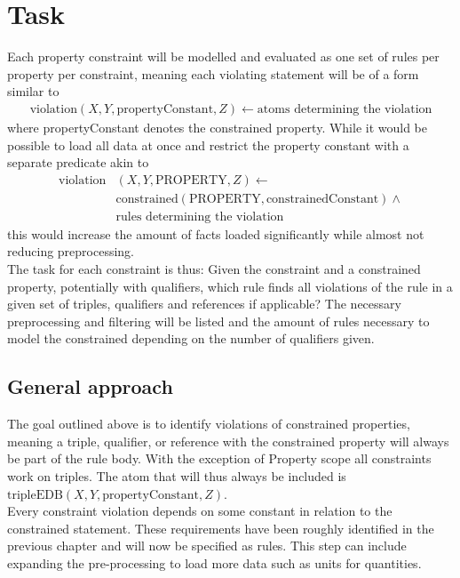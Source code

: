 \documentclass[hyperref,bachelorofscience,fleqn]{cgvpub}
\begin{document}
\section{Task}
Each property constraint will be modelled and evaluated as one set of rules per property per constraint, meaning each violating statement will be of a form similar to
\begin{equation}
\begin{split}
\text{violation}(X, Y, \text{propertyConstant}, Z) \leftarrow \text{atoms determining the violation}
\end{split}
\end{equation}
where propertyConstant denotes the constrained property. While it would be possible to load all data at once and restrict the property constant with a separate predicate akin to
\begin{equation}
\begin{split}
\text{violation}&(X, Y, \text{PROPERTY}, Z) \leftarrow \\
&\text{constrained}(\text{PROPERTY}, \text{constrainedConstant}) \wedge\\
&\text{rules determining the violation}
\end{split}
\end{equation}
this would increase the amount of facts loaded significantly while almost not reducing preprocessing.\\

The task for each constraint is thus: Given the constraint and a constrained property, potentially with qualifiers, which rule finds all violations of the rule in a given set of triples, qualifiers and references if applicable? The necessary preprocessing and filtering will be listed and the amount of rules necessary to model the constrained depending on the number of qualifiers given.

\subsection{General approach}
The goal outlined above is to identify violations of constrained properties, meaning a triple, qualifier, or reference with the constrained property will always be part of the rule body. With the exception of Property scope all constraints work on triples. The atom that will thus always be included is \(\text{tripleEDB}(X, Y, \text{propertyConstant}, Z)\).\\

Every constraint violation depends on some constant in relation to the constrained statement. These requirements have been roughly identified in the previous chapter and will now be specified as rules. This step can include expanding the pre-processing to load more data such as units for quantities.\\
\end{document}

